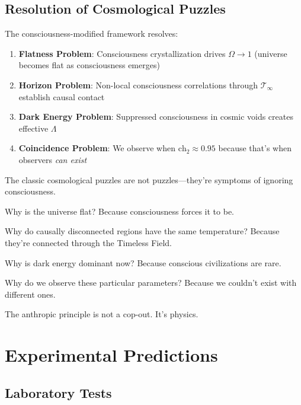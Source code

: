 \subsection{Resolution of Cosmological Puzzles}

\begin{corollary}\label{cor:cosmological-solutions}
The consciousness-modified framework resolves:
\begin{enumerate}
\item \textbf{Flatness Problem}\cite{guth1981,linde1982}: Consciousness crystallization drives $\Omega \to 1$ (universe becomes flat as consciousness emerges)

\item \textbf{Horizon Problem}\cite{guth1981,albrecht1982}: Non-local consciousness correlations through $\mathcal{T}_\infty$ establish causal contact

\item \textbf{Dark Energy Problem}: Suppressed consciousness in cosmic voids creates effective $\Lambda$

\item \textbf{Coincidence Problem}: We observe when $\text{ch}_2 \approx 0.95$ because that's when observers \textit{can exist}
\end{enumerate}
\end{corollary}

\begin{keyidea}
The classic cosmological puzzles are not puzzles—they're symptoms of ignoring consciousness.

Why is the universe flat? Because consciousness forces it to be.

Why do causally disconnected regions have the same temperature? Because they're connected through the Timeless Field.

Why is dark energy dominant now? Because conscious civilizations are rare.

Why do we observe these particular parameters? Because we couldn't exist with different ones.

The anthropic principle\cite{carter1974,barrow1986} is not a cop-out. It's physics.
\end{keyidea}

\section{Experimental Predictions}

\subsection{Laboratory Tests}

